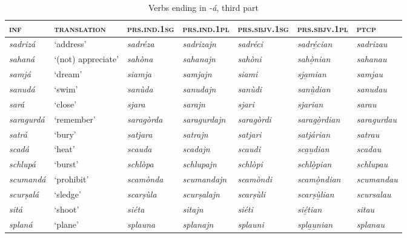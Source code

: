 \begin{sidewaystable} 
	\caption{Verbs ending in \textit{-á}, third part}
	\label{stemalta3}
	\begin{tabularx}{\textwidth}{lllllll} 
		\lsptoprule
		\textsc{\textbf{inf}} & \textsc{\textbf{translation}} & \textsc{\textbf{prs.ind.1sg}} & \textsc{\textbf{prs.ind.1pl}} & \textsc{\textbf{prs.sbjv.1sg}} & \textsc{\textbf{prs.sbjv.1pl}} & \textsc{\textbf{ptcp}} \\
		\midrule
		\textit{sadrizá} & `address' & \textit{sadréza} & \textit{sadrizajn} & \textit{sadréci} & \textit{sadré̱cian} & \textit{sadrizau}\\
		\textit{sahaná} & ‘(not) appreciate’ & \textit{sahòna} & \textit{sahanajn} & \textit{sahòni} & \textit{sahò̱nian} & \textit{sahanau}\\
		\textit{samjá} & ‘dream’ & \textit{siamja} & \textit{samjajn} & \textit{siami} &  \textit{sj̱a̱mian} & \textit{samjau}\\
		\textit{sanudá} & `swim' & \textit{sanùda} & \textit{sanudajn} & \textit{sanùdi} & \textit{sanù̱dian} & \textit{sanudau} \\
		\textit{sará} & `close' & \textit{sjara} & \textit{sarajn} & \textit{sjari} & \textit{s\underline{j}arian} & \textit{sarau} \\
		\textit{saragurdá} & `remember' & \textit{saragòrda} & \textit{saragurdajn} & \textit{saragòrdi} & \textit{saragò̱rdian} & \textit{saragurdau}\\
		\textit{satrá} & `bury' & \textit{satjara} & \textit{satrajn} & \textit{satjari} & \textit{satjárian} & \textit{satrau}\\
		\textit{scadá} & `heat' & \textit{scauda} & \textit{scadajn} & \textit{scaudi} & \textit{sca̱u̱dian} & \textit{scadau}\\
		\textit{schlupá} & `burst' & \textit{schlòpa} & \textit{schlupajn} & \textit{schlòpi} & \textit{schlò̱pian} & \textit{schlupau}\\
		\textit{scumandá} & `prohibit' & \textit{scamònda} & \textit{scumandajn} & \textit{scamòndi} & \textit{scamò̱ndian} & \textit{scumandau} \\
		\textit{scurṣalá} & `sledge' & \textit{scarṣùla} & \textit{scurṣalajn} & \textit{scarṣùli} & \textit{scarṣù̱lian} & \textit{scursalau}\\
		\textit{sitá} & ‘shoot’ & \textit{siéta} & \textit{sitajn} & \textit{siéti} & \textit{sié̱tian} & \textit{sitau}\\
		\textit{splaná} & ‘plane’ & \textit{splauna} & \textit{splanajn} & \textit{splauni} & \textit{spla̱u̱nian} & \textit{splanau}\\

\end{tabularx}
\end{sidewaystable}
